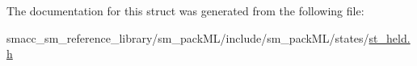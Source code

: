 The documentation for this struct was generated from the following file\+:\begin{DoxyCompactItemize}
\item 
smacc\+\_\+sm\+\_\+reference\+\_\+library/sm\+\_\+pack\+M\+L/include/sm\+\_\+pack\+M\+L/states/\hyperlink{sm__packML_2include_2sm__packML_2states_2st__held_8h}{st\+\_\+held.\+h}\end{DoxyCompactItemize}
